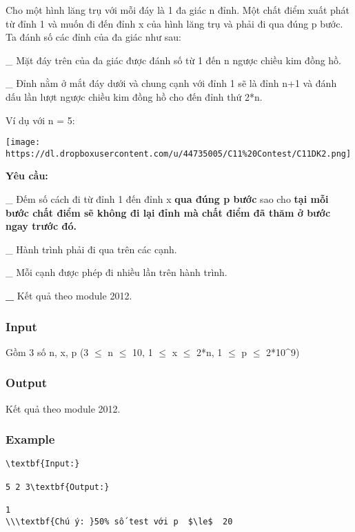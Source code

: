 



   Cho một hình lăng trụ với mỗi đáy là 1 đa giác n đỉnh. Một chất điểm xuất phát từ đỉnh 1 và muốn đi đến đỉnh x của hình lăng trụ và phải đi qua đúng p bước. Ta đánh số các đỉnh của đa giác như sau:  

   \_ Mặt đáy trên của đa giác được đánh số từ 1 đến n ngược chiều kim đồng hồ.  

   \_ Đỉnh nằm ở mắt đáy dưới và chung cạnh với đỉnh 1 sẽ là đỉnh n+1 và đánh dấu lần lượt ngược chiều kim đồng hồ cho đến đỉnh thứ 2*n.  

   Ví dụ với n = 5:  


\texttt{[image: https://dl.dropboxusercontent.com/u/44735005/C11\%20Contest/C11DK2.png]}

\textbf{    Yêu cầu:   }

   \_ Đếm số cách đi từ đỉnh 1 đến đỉnh x   \textbf{    qua đúng p bước   }   sao cho   \textbf{    tại mỗi bước chất điểm sẽ không đi lại đỉnh mà chất điểm đã thăm ở bước ngay trước đó.   }\textbf{}

   \_ Hành trình phải đi qua trên các cạnh.  

   \_ Mỗi cạnh được phép đi nhiều lần trên hành trình.  

\textbf{    \_   }   Kết quả theo module 2012.  

\subsubsection{   Input  }

   Gồm 3 số n, x, p (3  $\le$  n  $\le$  10, 1  $\le$  x  $\le$  2*n, 1  $\le$  p  $\le$  2*10\textasciicircum9)  

\subsubsection{   Output  }

   Kết quả theo module 2012.  

\subsubsection{   Example  }
\begin{verbatim}
\textbf{Input:}

5 2 3\textbf{Output:}

1
\\\textbf{Chú ý: }50% số test với p  $\le$  20
\end{verbatim}
